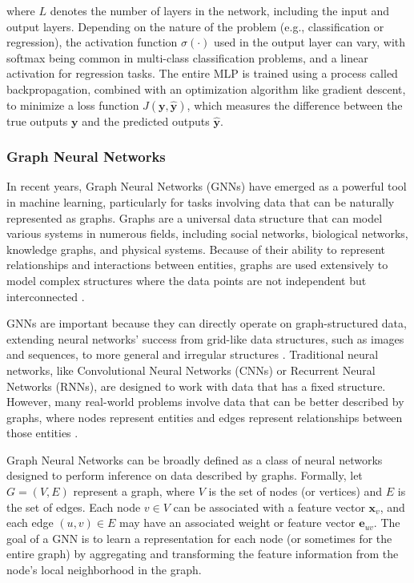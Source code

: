 where $L$ denotes the number of layers in the network, including the input and output layers. Depending on the nature of the problem (e.g., classification or regression), the activation function $\sigma(\cdot)$ used in the output layer can vary, with softmax being common in multi-class classification problems, and a linear activation for regression tasks. The entire MLP is trained using a process called backpropagation, combined with an optimization algorithm like gradient descent, to minimize a loss function $J(\mathbf{y}, \mathbf{\hat{y}})$, which measures the difference between the true outputs $\mathbf{y}$ and the predicted outputs $\mathbf{\hat{y}}$. 


\subsubsection{Graph Neural Networks}

In recent years, Graph Neural Networks (GNNs) have emerged as a powerful tool in machine learning, particularly for tasks involving data that can be naturally represented as graphs. Graphs are a universal data structure that can model various systems in numerous fields, including social networks, biological networks, knowledge graphs, and physical systems. Because of their ability to represent relationships and interactions between entities, graphs are used extensively to model complex structures where the data points are not independent but interconnected \cite{Jia_Wang_Shou_Hosseini_Bai_2023}.

GNNs are important because they can directly operate on graph-structured data, extending neural networks' success from grid-like data structures, such as images and sequences, to more general and irregular structures \cite{Jia_Wang_Shou_Hosseini_Bai_2023a} . Traditional neural networks, like Convolutional Neural Networks (CNNs) or Recurrent Neural Networks (RNNs), are designed to work with data that has a fixed structure. However, many real-world problems involve data that can be better described by graphs, where nodes represent entities and edges represent relationships between those entities \cite{Gupta_Matta_Pant_2021}. 

Graph Neural Networks can be broadly defined as a class of neural networks designed to perform inference on data described by graphs. Formally, let $G = (V, E)$ represent a graph, where $V$ is the set of nodes (or vertices) and $E$ is the set of edges. Each node $v \in V$ can be associated with a feature vector $\mathbf{x}_v$, and each edge $(u, v) \in E$ may have an associated weight or feature vector $\mathbf{e}_{uv}$. The goal of a GNN is to learn a representation for each node (or sometimes for the entire graph) by aggregating and transforming the feature information from the node's local neighborhood in the graph.


